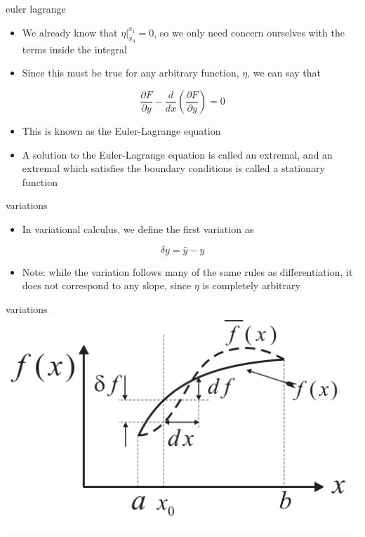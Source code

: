 \documentclass[
  letterpaper,
  ignorenonframetext,
  aspectratio=43,
  handout,
  12pt]{beamer}
\providecommand{\tightlist}{%
  \setlength{\itemsep}{0pt}\setlength{\parskip}{0pt}}
\providecommand{\tightlist}{%
\setlength{\itemsep}{0pt}\setlength{\parskip}{0pt}}
\let\Oldincludegraphics\includegraphics
\renewcommand{\includegraphics}[2][]{\Oldincludegraphics[width=\textwidth,height=0.7\textheight,keepaspectratio]{#2}}
\begin{document}
\begin{frame}{euler lagrange}
\protect\hypertarget{euler-lagrange-6}{}
\begin{itemize}
\tightlist
\item
  We already know that \(\eta|_{x_0}^{x_1}=0\), so we only need concern
  ourselves with the terms inside the integral
\item
  Since this must be true for any arbitrary function, \(\eta\), we can
  say that
\end{itemize}

\[\frac{\partial F}{\partial y} - \frac{d}{dx} \left( \frac{\partial F}{\partial y} \right) = 0\]

\begin{itemize}
\tightlist
\item
  This is known as the Euler-Lagrange equation
\item
  A solution to the Euler-Lagrange equation is called an extremal, and
  an extremal which satisfies the boundary conditions is called a
  stationary function
\end{itemize}
\end{frame}

\begin{frame}{variations}
\protect\hypertarget{variations}{}
\begin{itemize}
\tightlist
\item
  In variational calculus, we define the first variation as
\end{itemize}

\[\delta y = \bar{y} - y\]

\begin{itemize}
\tightlist
\item
  Note: while the variation follows many of the same rules as
  differentiation, it does not correspond to any slope, since \(\eta\)
  is completely arbitrary
\end{itemize}
\end{frame}

\begin{frame}{variations}
\protect\hypertarget{variations-1}{}
\includegraphics{../images/variations.PNG}
\end{frame}
\end{document}
